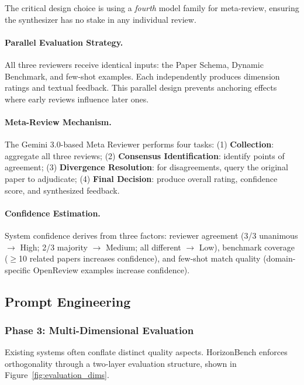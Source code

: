 The critical design choice is using a \textit{fourth} model family for meta-review, ensuring the synthesizer has no stake in any individual review.

\paragraph{Parallel Evaluation Strategy.} All three reviewers receive identical inputs: the Paper Schema, Dynamic Benchmark, and few-shot examples. Each independently produces dimension ratings and textual feedback. This parallel design prevents anchoring effects where early reviews influence later ones.

\paragraph{Meta-Review Mechanism.} The Gemini 3.0-based Meta Reviewer performs four tasks: (1) \textbf{Collection}: aggregate all three reviews; (2) \textbf{Consensus Identification}: identify points of agreement; (3) \textbf{Divergence Resolution}: for disagreements, query the original paper to adjudicate; (4) \textbf{Final Decision}: produce overall rating, confidence score, and synthesized feedback.

\paragraph{Confidence Estimation.} System confidence derives from three factors: reviewer agreement (3/3 unanimous $\rightarrow$ High; 2/3 majority $\rightarrow$ Medium; all different $\rightarrow$ Low), benchmark coverage ($\geq$10 related papers increases confidence), and few-shot match quality (domain-specific OpenReview examples increase confidence).

\subsection{Prompt Engineering}

\subsubsection{Phase 3: Multi-Dimensional Evaluation}

Existing systems often conflate distinct quality aspects. HorizonBench enforces orthogonality through a two-layer evaluation structure, shown in Figure~\ref{fig:evaluation_dims}.

